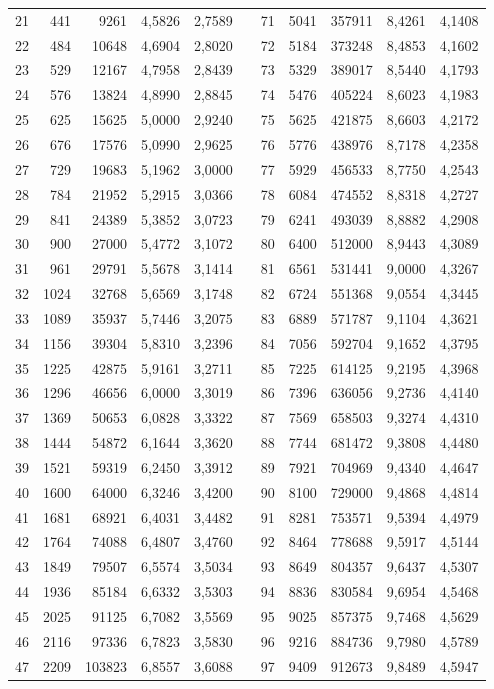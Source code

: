 \begin{longtable}{rrrrrrrrrrr}
21&441&9261&4,5826&2,7589&&71&5041&357911&8,4261&4,1408\\
22&484&10648&4,6904&2,8020&&72&5184&373248&8,4853&4,1602\\
23&529&12167&4,7958&2,8439&&73&5329&389017&8,5440&4,1793\\
24&576&13824&4,8990&2,8845&&74&5476&405224&8,6023&4,1983\\
25&625&15625&5,0000&2,9240&&75&5625&421875&8,6603&4,2172\\
26&676&17576&5,0990&2,9625&&76&5776&438976&8,7178&4,2358\\
27&729&19683&5,1962&3,0000&&77&5929&456533&8,7750&4,2543\\
28&784&21952&5,2915&3,0366&&78&6084&474552&8,8318&4,2727\\
29&841&24389&5,3852&3,0723&&79&6241&493039&8,8882&4,2908\\
30&900&27000&5,4772&3,1072&&80&6400&512000&8,9443&4,3089\\
31&961&29791&5,5678&3,1414&&81&6561&531441&9,0000&4,3267\\
32&1024&32768&5,6569&3,1748&&82&6724&551368&9,0554&4,3445\\
33&1089&35937&5,7446&3,2075&&83&6889&571787&9,1104&4,3621\\
34&1156&39304&5,8310&3,2396&&84&7056&592704&9,1652&4,3795\\
35&1225&42875&5,9161&3,2711&&85&7225&614125&9,2195&4,3968\\
36&1296&46656&6,0000&3,3019&&86&7396&636056&9,2736&4,4140\\
37&1369&50653&6,0828&3,3322&&87&7569&658503&9,3274&4,4310\\
38&1444&54872&6,1644&3,3620&&88&7744&681472&9,3808&4,4480\\
39&1521&59319&6,2450&3,3912&&89&7921&704969&9,4340&4,4647\\
40&1600&64000&6,3246&3,4200&&90&8100&729000&9,4868&4,4814\\
41&1681&68921&6,4031&3,4482&&91&8281&753571&9,5394&4,4979\\
42&1764&74088&6,4807&3,4760&&92&8464&778688&9,5917&4,5144\\
43&1849&79507&6,5574&3,5034&&93&8649&804357&9,6437&4,5307\\
44&1936&85184&6,6332&3,5303&&94&8836&830584&9,6954&4,5468\\
45&2025&91125&6,7082&3,5569&&95&9025&857375&9,7468&4,5629\\
46&2116&97336&6,7823&3,5830&&96&9216&884736&9,7980&4,5789\\
47&2209&103823&6,8557&3,6088&&97&9409&912673&9,8489&4,5947\\

\end{longtable}
